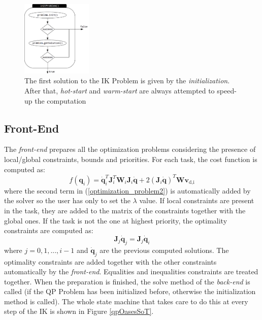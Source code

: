 \begin{figure}[htb] 
\centering 
\includegraphics[width=0.3\textwidth]{images/wholebody/QPOasesProblem_init2.png} 
\caption{The first solution to the IK Problem is given by the \emph{initialization}. After that, \emph{hot-start} and \emph{warm-start} are always attempted to speed-up the computation} 
\label{qpOasesProblemInit}
\end{figure}


\subsection{Front-End}
The \emph{front-end} prepares all the optimization problems considering the presence of local/global constraints, bounds and priorities. For each task, the cost function is computed as:
\begin{equation}
f(\mathbf{q}_i) = \dot{\mathbf{q}}_i^T\mathbf{J}_i^T\mathbf{W}_i\mathbf{J}_i\dot{\mathbf{q}} + 2(\mathbf{J}_i\dot{\mathbf{q}})^T\mathbf{W}\mathbf{v}_\text{d,i}
\label{cost_function}
\end{equation}
where the second term in (\ref{optimization_problem2}) is automatically added by the solver so the user has only to set the $\lambda$ value. If local constraints are present in the task, they are added to the matrix of the constraints together with the global ones. If the task is not the one at highest priority, the optimality constraints are computed as:
\begin{equation}
\mathbf{J}_{j}\dot{\mathbf{q}}_{j} = \mathbf{J}_{j}\dot{\mathbf{q}}_i
\label{optimality_constraints}
\end{equation}
where $j = 0, 1, ..., i-1$ and $\dot{\mathbf{q}}_{j}$ are the previous computed solutions. The optimality constraints are added together with the other constraints automatically by the \emph{front-end}. Equalities and inequalities constraints are treated together. When the preparation is finished, the solve method of the \emph{back-end} is called (if the QP Problem has been initialized before, otherwise the initialization method is called). The whole state machine that takes care to do this at every step of the IK is shown in Figure \ref{qpOasesSoT}. 


